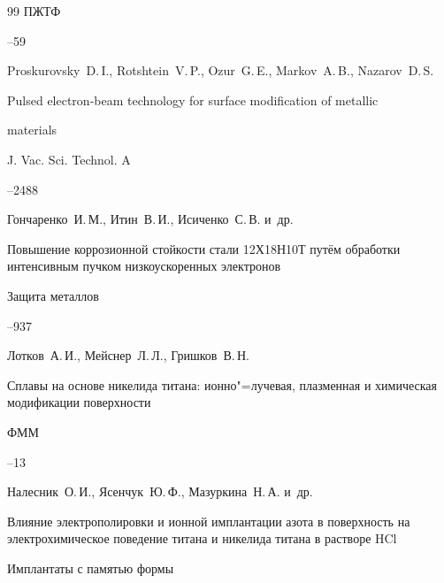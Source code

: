 \begin{thebibliography}{99}
\jour ПЖТФ




--59




\by Proskurovsky~D.\,I., Rotshtein~V.\,P., Ozur~G.\,E., Markov~A.\,B., Nazarov~D.\,S.

\paper Pulsed electron-beam technology for surface modification of metallic

materials

\jour  J. Vac. Sci. Technol. A




--2488




\by Гончаренко~И.\,М., Итин~В.\,И., Исиченко~С.\,В. и~др.

\paper Повышение коррозионной стойкости стали 12Х18Н10Т путём обработки интенсивным пучком низкоускоренных электронов

\jour Защита металлов




--937




\by Лотков~А.\,И., Мейснер~Л.\,Л., Гришков~В.\,Н.

\paper Сплавы на основе никелида титана: ионно"=лучевая, плазменная и химическая модификации поверхности

\jour ФММ




--13




\by Налесник~О.\,И., Ясенчук~Ю.\,Ф., Мазуркина~Н.\,А. и~др.

\paper  Влияние электрополировки и ионной имплантации азота в поверхность на электрохимическое поведение титана и никелида титана в растворе HCl

\jour Имплантаты с памятью формы


\end{thebibliography}
